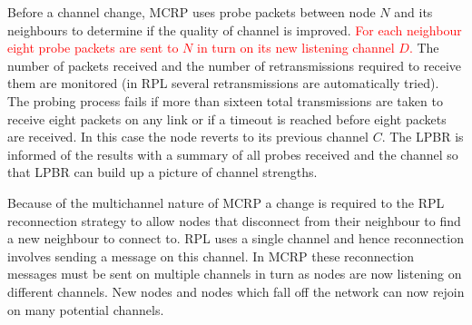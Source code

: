 Before a channel change, MCRP uses probe packets between node $N$ and its neighbours to determine if the quality of channel is improved.  \textcolor{red}{For each neighbour eight probe packets are sent to $N$ in turn on its new listening channel $D$.} The number of packets received and the number of retransmissions required to receive them are monitored (in RPL several retransmissions are automatically tried).  The probing process fails if more than sixteen total transmissions are taken to receive eight packets on any link or if a timeout is reached before eight packets are received. In this case the node reverts to its previous channel $C$.  The LPBR is informed of the results with a summary of all probes received and the channel so that LPBR can build up a picture of channel strengths.

Because of the multichannel nature of MCRP a change is required to the RPL reconnection strategy to allow nodes that disconnect from their neighbour to find a new neighbour to connect to.  RPL uses a single channel and hence reconnection involves sending a message on this channel.  In MCRP these reconnection messages must be sent on multiple channels in turn as nodes are now listening on different channels.  New nodes and nodes which fall off the network can now rejoin on many potential channels.
